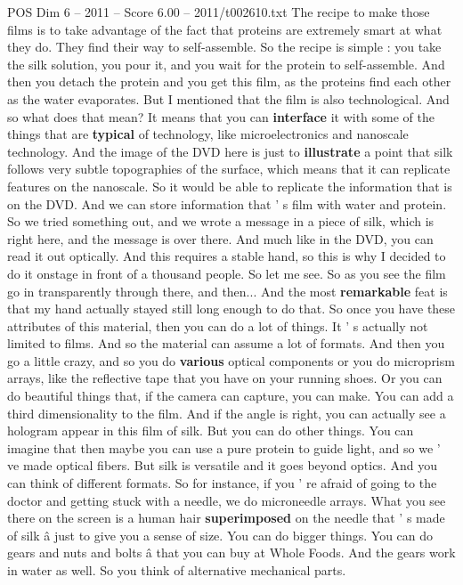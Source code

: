 \begin{textsample}{POS Dim 6 – 2011 – Score 6.00 – 2011/t002610.txt}
The recipe to make those films is to take advantage of the fact that proteins are extremely smart at what they do.
They find their way to self-assemble.
So the recipe is simple : you take the silk solution, you pour it, and you wait for the protein to self-assemble.
And then you detach the protein and you get this film, as the proteins find each other as the water evaporates.
But I mentioned that the film is also technological.
And so what does that mean?
It means that you can \textbf{interface} it with some of the things that are \textbf{typical} of technology, like microelectronics and nanoscale technology.
And the image of the DVD here is just to \textbf{illustrate} a point that silk follows very subtle topographies of the surface, which means that it can replicate features on the nanoscale.
So it would be able to replicate the information that is on the DVD.
And we can store information that ' s film with water and protein.
So we tried something out, and we wrote a message in a piece of silk, which is right here, and the message is over there.
And much like in the DVD, you can read it out optically.
And this requires a stable hand, so this is why I decided to do it onstage in front of a thousand people.
So let me see.
So as you see the film go in transparently through there, and then...
And the most \textbf{remarkable} feat is that my hand actually stayed still long enough to do that.
So once you have these attributes of this material, then you can do a lot of things.
It ' s actually not limited to films.
And so the material can assume a lot of formats.
And then you go a little crazy, and so you do \textbf{various} optical components or you do microprism arrays, like the reflective tape that you have on your running shoes.
Or you can do beautiful things that, if the camera can capture, you can make.
You can add a third dimensionality to the film.
And if the angle is right, you can actually see a hologram appear in this film of silk.
But you can do other things.
You can imagine that then maybe you can use a pure protein to guide light, and so we ' ve made optical fibers.
But silk is versatile and it goes beyond optics.
And you can think of different formats.
So for instance, if you ' re afraid of going to the doctor and getting stuck with a needle, we do microneedle arrays.
What you see there on the screen is a human hair \textbf{superimposed} on the needle that ' s made of silk â just to give you a sense of size.
You can do bigger things.
You can do gears and nuts and bolts â that you can buy at Whole Foods.
And the gears work in water as well.
So you think of alternative mechanical parts.

\end{textsample}
